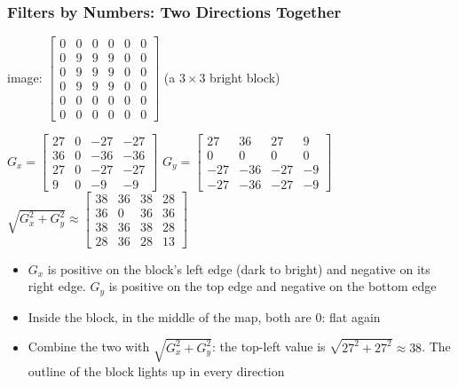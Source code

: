 \begin{frame}[fragile] \frametitle{Filters by Numbers: Two Directions Together}
\begin{center}
\tiny
\setlength{\arraycolsep}{2pt}
image: $\begin{bmatrix}0&0&0&0&0&0\\0&9&9&9&0&0\\0&9&9&9&0&0\\0&9&9&9&0&0\\0&0&0&0&0&0\\0&0&0&0&0&0\end{bmatrix}$ (a $3 \times 3$ bright block)

\vspace{4pt}
\scriptsize
$G_x = \begin{bmatrix}27&0&-27&-27\\36&0&-36&-36\\27&0&-27&-27\\9&0&-9&-9\end{bmatrix}$
\quad
$G_y = \begin{bmatrix}27&36&27&9\\0&0&0&0\\-27&-36&-27&-9\\-27&-36&-27&-9\end{bmatrix}$
\quad
$\sqrt{G_x^2 + G_y^2} \approx \begin{bmatrix}38&36&38&28\\36&0&36&36\\38&36&38&28\\28&36&28&13\end{bmatrix}$
\end{center}
\begin{itemize}
\item $G_x$ is positive on the block's left edge (dark to bright) and negative on its right edge. $G_y$ is positive on the top edge and negative on the bottom edge
\item Inside the block, in the middle of the map, both are $0$: flat again
\item Combine the two with $\sqrt{G_x^2 + G_y^2}$: the top-left value is $\sqrt{27^2 + 27^2} \approx 38$. The outline of the block lights up in every direction
\end{itemize}
\end{frame}

